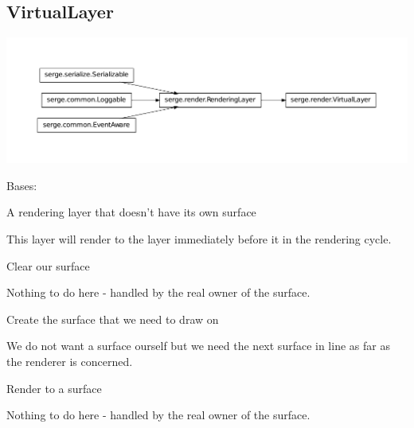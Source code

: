 \documentclass[letterpaper,10pt,english]{sphinxmanual}
\begin{document}
\subsection{VirtualLayer}
\label{renderering:virtuallayer}
\includegraphics{inheritance-ad19284a075815c08d37d9fbe0742cb1f722b19b.pdf}

\begin{fulllineitems}
\label{renderering:serge.render.VirtualLayer}
Bases: {\hyperref[renderering:serge.render.RenderingLayer]{}}

A rendering layer that doesn't have its own surface

This layer will render to the layer immediately
before it in the rendering cycle.

\begin{fulllineitems}
\label{renderering:serge.render.VirtualLayer.clearSurface}
Clear our surface

Nothing to do here - handled by the real owner of the surface.

\end{fulllineitems}


\begin{fulllineitems}
\label{renderering:serge.render.VirtualLayer.initSurface}
Create the surface that we need to draw on

We do not want a surface ourself but we need the next surface
in line as far as the renderer is concerned.

\end{fulllineitems}


\begin{fulllineitems}
\label{renderering:serge.render.VirtualLayer.render}
Render to a surface

Nothing to do here - handled by the real owner of the surface.

\end{fulllineitems}


\end{fulllineitems}
\end{document}

